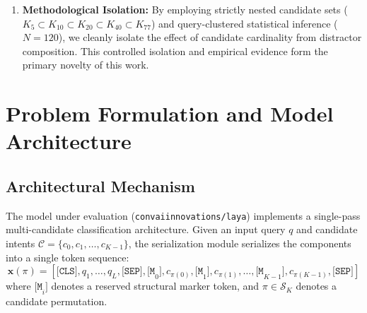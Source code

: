 \documentclass[11pt,a4paper]{article}
\begin{document}
\begin{enumerate}
\begin{itemize}
        \item Inference-time random and cyclic permutation marginalization laws, and
        \item Empirical confidence calibration (ECE) effects.
    \end{itemize}
    \item \textbf{Methodological Isolation:} By employing strictly nested candidate sets ($K_5 \subset K_{10} \subset K_{20} \subset K_{40} \subset K_{77}$) and query-clustered statistical inference ($N=120$), we cleanly isolate the effect of candidate cardinality from distractor composition. This controlled isolation and empirical evidence form the primary novelty of this work.
\end{enumerate}

\section{Problem Formulation and Model Architecture}

\subsection{Architectural Mechanism}

The model under evaluation (\nolinkurl{convaiinnovations/laya}) implements a single-pass multi-candidate classification architecture. Given an input query $q$ and candidate intents $\mathcal{C} = \{c_0, c_1, \dots, c_{K-1}\}$, the serialization module serializes the components into a single token sequence:
\begin{equation}
\mathbf{x}(\pi) = \left[ \texttt{[CLS]}, q_1, \dots, q_L, \texttt{[SEP]}, \texttt{[M}_0\texttt{]}, c_{\pi(0)}, \texttt{[M}_1\texttt{]}, c_{\pi(1)}, \dots, \texttt{[M}_{K-1}\texttt{]}, c_{\pi(K-1)}, \texttt{[SEP]} \right]
\end{equation}
where $\texttt{[M}_i\texttt{]}$ denotes a reserved structural marker token, and $\pi \in \mathcal{S}_K$ denotes a candidate permutation.
\end{document}
